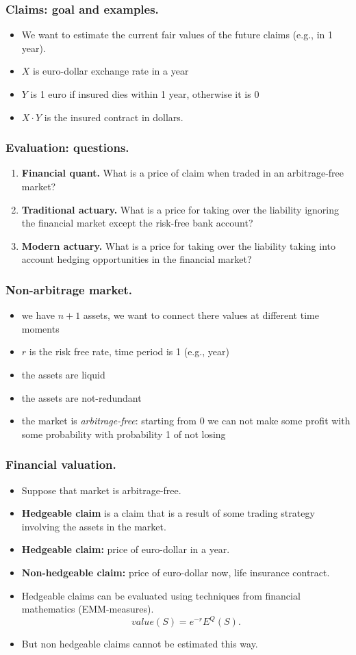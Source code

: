 \documentclass{beamer}
\begin{document}
\begin{frame}[fragile]
\frametitle{Claims: goal and examples.}
\begin{itemize}
  \item We want to estimate the current fair values of the future claims (e.g., in 1 year).
	\item $X$ is euro-dollar exchange rate in a year
	\item $Y$ is 1 euro if insured dies within 1 year, otherwise it is 0
	\item $X\cdot Y$ is the insured contract in dollars.
\end{itemize}
\end{frame}
\begin{frame}[fragile]
\frametitle{Evaluation: questions.}
\begin{enumerate}
\item \textbf{Financial quant.} What is a price of claim when traded in an arbitrage-free market?
\item \textbf{Traditional actuary.} What is a price for taking over the liability ignoring the financial market except the risk-free bank account?
\item \textbf{Modern actuary.} What is a price for taking over the liability taking into account hedging opportunities in the financial market?
\end{enumerate}
\end{frame}
\begin{frame}[fragile]
\frametitle{Non-arbitrage market.}
\begin{itemize}
  \item we have $n+1$ assets, we want to connect there values at different time moments
	\item $r$ is the risk free rate, time period is 1 (e.g., year)
	\item the assets are liquid
	\item the assets are not-redundant
	\item the market is \textit{arbitrage-free}: starting from 0 we can not make some profit with some probability with probability 1 of not losing
\end{itemize}
\end{frame}
\begin{frame}[fragile]
\frametitle{Financial valuation.}
\begin{itemize}
\item Suppose that market is arbitrage-free.
\item \textbf{Hedgeable claim} is a claim that is a result of some trading strategy involving the assets in the market.
\item \textbf{Hedgeable claim:} price of euro-dollar in a year.
\item \textbf{Non-hedgeable claim:} price of euro-dollar now, life insurance contract.
\item Hedgeable claims can be evaluated using techniques from financial mathematics (EMM-measures).
$$value(S) = e^{-r}E^Q(S).$$
\item But non hedgeable claims cannot be estimated this way.
\end{itemize}
\end{frame}
\end{document}
